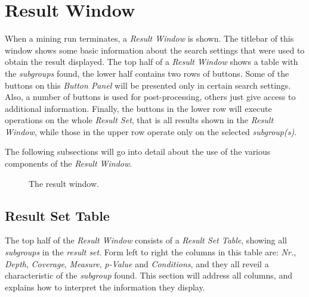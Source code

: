\documentclass{article}
\begin{document}
\section{Result Window}
\label{section:result-window}
When a mining run terminates, a \emph{Result Window} is shown.
The titlebar of this window shows some basic information about the search settings that were used to obtain the result displayed.
The top half of a \emph{Result Window} shows a table with the \emph{subgroups} found, the lower half contains two rows of buttons.
Some of the buttons on this \emph{Button Panel} will be presented only in certain search settings.
Also, a number of buttons is used for post-processing, others just give access to additional information.
Finally, the buttons in the lower row will execute operations on the whole \emph{Result Set}, that is all results shown in the \emph{Result Window}, while those in the upper row operate only on the selected \emph{subgroup(s)}.

The following subsections will go into detail about the use of the various components of the \emph{Result Window}.

\begin{figure}
\begin{center}
\centering
{}
\caption{The result window.}
\end{center}
\label{fig:resultwindow}
\end{figure}


\subsection{Result Set Table}
\label{result-window:result-set-table}
The top half of the \emph{Result Window} consists of a \emph{Result Set Table}, showing all \emph{subgroups} in the \emph{result set}.
Form left to right the columns in this table are: \emph{Nr.}, \emph{Depth}, \emph{Coverage}, \emph{Measure}, \emph{p-Value} and \emph{Conditions}, and they all reveil a characteristic of the \emph{subgroup} found.
This section will address all columns, and explains how to interpret the information they display.
\end{document}
